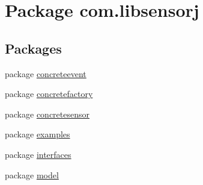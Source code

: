 \hypertarget{namespacecom_1_1libsensorj}{}\section{Package com.\+libsensorj}
\label{namespacecom_1_1libsensorj}
\subsection*{Packages}
\begin{DoxyCompactItemize}
\item 
package \hyperlink{namespacecom_1_1libsensorj_1_1concreteevent}{concreteevent}
\item 
package \hyperlink{namespacecom_1_1libsensorj_1_1concretefactory}{concretefactory}
\item 
package \hyperlink{namespacecom_1_1libsensorj_1_1concretesensor}{concretesensor}
\item 
package \hyperlink{namespacecom_1_1libsensorj_1_1examples}{examples}
\item 
package \hyperlink{namespacecom_1_1libsensorj_1_1interfaces}{interfaces}
\item 
package \hyperlink{namespacecom_1_1libsensorj_1_1model}{model}
\end{DoxyCompactItemize}
